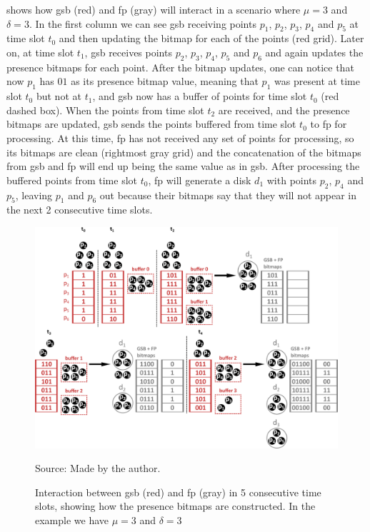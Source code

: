  shows how \ac{gsb} (red) and \ac{fp} (gray) will interact in a scenario where $\mu = 3$ and
$\delta = 3$. In the first column we can see \ac{gsb} receiving points $p_1$, $p_2$, $p_3$, $p_4$ and $p_5$ at time slot
$t_0$ and then updating the bitmap for each of the points (red grid). Later on, at time slot $t_1$, \ac{gsb} receives
points $p_2$, $p_3$, $p_4$, $p_5$ and $p_6$ and again updates the presence bitmaps for each point. After the bitmap
updates, one can notice that now $p_1$ has $01$ as its presence bitmap value, meaning that $p_1$ was present at time
slot $t_0$ but not at $t_1$, and \ac{gsb} now has a buffer of points for time slot $t_0$ (red dashed box). When the
points from time slot $t_2$ are received, and the presence bitmaps are updated, \ac{gsb} sends the points buffered from
time slot $t_0$ to \ac{fp} for processing. At this time, \ac{fp} has not received any set of points for processing, so
its bitmaps are clean (rightmost gray grid) and the concatenation of the bitmaps from \ac{gsb} and \ac{fp} will end up
being the same value as in \ac{gsb}. After processing the buffered points from time slot $t_0$, \ac{fp} will generate a
disk $d_1$ with points $p_2$, $p_4$ and $p_5$, leaving $p_1$ and $p_6$ out because their bitmaps say that they will not
appear in the next 2 consecutive time slots.

\begin{figure}[h!]
    \centering
    \caption{Interaction between \ac{gsb} (red) and \ac{fp} (gray) in 5 consecutive time slots, showing how the presence
        bitmaps are constructed. In the example we have $\mu = 3$ and $\delta = 3$}
    \centerline{\includegraphics[width=\linewidth]{images/gsb_fp_flow.eps}}
    \footnotesize{Source: Made by the author.}
    \label{fig:gsb_fp_flow}
\end{figure}

